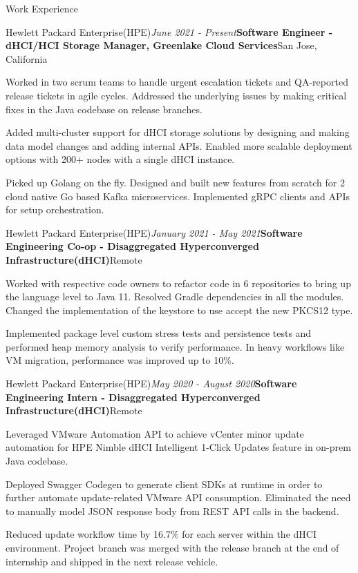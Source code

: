 \documentclass{resume}
\begin{document}
\begin{rSection}{Work Experience}

\begin{rSubsection}{Hewlett Packard Enterprise(HPE)}{\em June 2021 - Present}{\textbf{Software Engineer - dHCI/HCI Storage Manager, Greenlake Cloud Services}}{San Jose, California}{}
\item Worked in two scrum teams to handle urgent escalation tickets and QA-reported release tickets in agile cycles. Addressed the underlying issues by making critical fixes in the Java codebase on release branches.
\item Added multi-cluster support for dHCI storage solutions by designing and making data model changes and adding internal APIs. Enabled more scalable deployment options with 200+ nodes with a single dHCI instance. 
\item Picked up Golang on the fly. Designed and built new features from scratch for 2 cloud native Go based Kafka microservices. Implemented gRPC clients and APIs for setup orchestration.


\end{rSubsection}
\begin{rSubsection}{Hewlett Packard Enterprise(HPE)}{\em January 2021 - May 2021}{\textbf{Software Engineering Co-op - Disaggregated Hyperconverged Infrastructure(dHCI)}}{Remote}{}
\item Worked with respective code owners to refactor code in 6 repositories to bring up the language level to Java 11. Resolved Gradle dependencies in all the modules. Changed the implementation of the keystore to use accept the new PKCS12 type.
\item Implemented package level custom stress tests and persistence tests and performed heap memory analysis to verify performance. In heavy workflows like VM migration, performance was improved up to 10\%.




\end{rSubsection}

\begin{rSubsection}{Hewlett Packard Enterprise(HPE)}{\em May 2020 - August 2020}{\textbf{Software Engineering Intern - Disaggregated Hyperconverged Infrastructure(dHCI)}}{Remote}{}
\item Leveraged VMware Automation API to achieve vCenter minor update automation for HPE Nimble dHCI Intelligent 1-Click Updates feature in on-prem Java codebase. 
\item Deployed Swagger Codegen to generate client SDKs at runtime in order to further automate update-related VMware API consumption. Eliminated the need to manually model JSON response body from REST API calls in the backend.
\item Reduced update workflow time by 16.7\% for each server within the dHCI environment. Project branch was merged with the release branch at the end of internship and shipped in the next release vehicle. 



\end{rSubsection}
\end{rSection}
\end{document}
